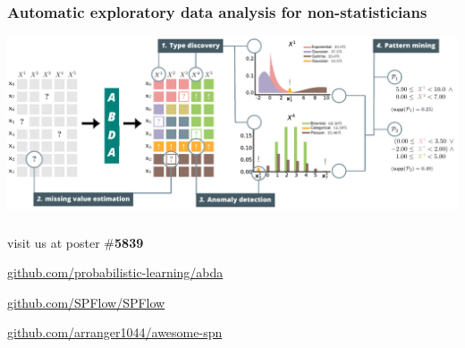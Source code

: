 \documentclass[xcolor={usenames,dvipsnames,svgnames}, compress, aspectratio=169, 11pt]{beamer}
\begin{document}
\begin{frame}[t, htt=mpigreen]
  \frametitle{Automatic exploratory data analysis for non-statisticians}
\vspace{10pt}
  \includegraphics[width=1.04\linewidth]{figures/abda-full}\\

  
\end{frame}


\begin{frame}
  \frametitle{}

  {\vspace{20pt}
    }\hspace{23pt}
  \Large visit us at poster \#\textbf{5839}
  \par\bigskip\bigskip

  {%
    }\hspace{75pt}
    \Large\url{github.com/probabilistic-learning/abda}\par\bigskip\bigskip

  {%
    }\hspace{10pt}
    \Large\url{github.com/SPFlow/SPFlow}\par\bigskip\bigskip
  
  {%
    }\hspace{12pt}
    \Large\url{github.com/arranger1044/awesome-spn}
\end{frame}

 
\end{document}
